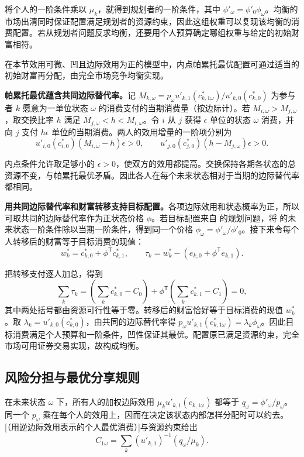 将个人的一阶条件乘以 $\mu_k$，就得到规划者的一阶条件，其中 $\phi'_\omega=\phi'_0\phi_\omega$。均衡的市场出清同时保证配置满足规划者的资源约束，因此这组权重可以复现该均衡的消费配置。若从规划者问题反求均衡，还要用个人预算确定哪组权重与给定的初始财富相符。

\begin{tcolorbox}[knowledge]
 在本节效用可微、凹且边际效用为正的模型中，内点帕累托最优配置可通过适当的初始财富再分配，由完全市场竞争均衡实现。
\end{tcolorbox}

\begin{solution}[label-content={证明},blank-type=none]
\textbf{帕累托最优蕴含共同边际替代率。}记 $M_{k,\omega}=p_\omega u'_{k,1}(c_{k,1\omega}^*)/u'_{k,0}(c_{k,0}^*)$ 为参与者 $k$ 愿意为一单位状态 $\omega$ 的消费支付的当期消费量（按边际计）。若 $M_{i,\omega}>M_{j,\omega}$，取交换比率 $h$ 满足 $M_{j,\omega}<h<M_{i,\omega}$。令 $i$ 从 $j$ 获得 $\epsilon$ 单位的状态 $\omega$ 消费，并向 $j$ 支付 $h\epsilon$ 单位的当期消费。两人的效用增量的一阶项分别为
\[
 u'_{i,0}(c_{i,0}^*)(M_{i,\omega}-h)\epsilon>0,\qquad
 u'_{j,0}(c_{j,0}^*)(h-M_{j,\omega})\epsilon>0.
\]

内点条件允许取足够小的 $\epsilon>0$，使双方的效用都提高。交换保持各期各状态的总资源不变，与帕累托最优矛盾。因此各人在每个未来状态相对于当期的边际替代率都相同。

\textbf{用共同边际替代率和财富转移支持目标配置。}各项边际效用和状态概率为正，所以可取共同的边际替代率作为正状态价格 $\phi$。若目标配置来自 的规划问题，将 的未来状态一阶条件除以当期一阶条件，得到同一个价格 $\phi_\omega=\phi'_\omega/\phi'_0$。接下来令每个人转移后的财富等于目标消费的现值：
\[
 w_k^*=c_{k,0}^*+\phi^{\mathsf T}c_{k,1}^*,\qquad
 \tau_k=w_k^*-(e_{k,0}+\phi^{\mathsf T}e_{k,1}).
\]

把转移支付逐人加总，得到
\[
 \sum_k\tau_k
 =\left(\sum_k c^*_{k,0}-C_0\right)
  +\phi^{\mathsf T}\left(\sum_k c^*_{k,1}-C_1\right)=0,
\]
其中两处括号都由资源可行性等于零。转移后的财富恰好等于目标消费的现值 $w_k^*$。取 $\lambda_k=u'_{k,0}(c^*_{k,0})$，由共同的边际替代率得 $p_\omega u'_{k,1}(c^*_{k,1\omega})=\lambda_k\phi_\omega$。因此目标消费满足个人预算和一阶条件，凹性保证其最优。配置原已满足资源约束，完全市场可用证券交易实现，故构成均衡。
\end{solution}

\subsection{风险分担与最优分享规则}
在未来状态 $\omega$ 下，所有人的加权边际效用 $\mu_k u'_{k,1}(c_{k,1\omega})$ 都等于 $q_\omega=\phi'_\omega/p_\omega$。同一个 $p_\omega$ 乘在每个人的效用上，因而在决定该状态内部怎样分配时可以约去。[（用逆边际效用表示的个人最优消费）]与资源约束给出
\[
 C_{1\omega}=\sum_k(u'_{k,1})^{-1}(q_\omega/\mu_k).
\]

